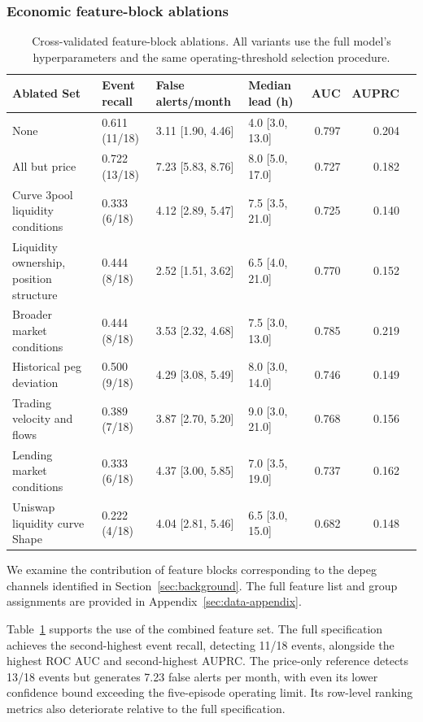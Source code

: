 \documentclass[a4paper,fleqn]{cas-sc}
\begin{document}
\subsubsection{Economic feature-block ablations}
\label{sec:ablation_results}

\begin{table}[pos=!htbp,align=\centering]
\caption{Cross-validated feature-block ablations. All variants use the full model's hyperparameters and the same operating-threshold selection procedure.}
\label{tab:ablation_15_kumo_tabular}
\begin{tabular}{llllrrr}
\toprule
Ablated Set & Event recall & False alerts/month & Median lead (h) & AUC & AUPRC \\
\midrule
None & 0.611 (11/18) & 3.11 [1.90, 4.46] & 4.0 [3.0, 13.0] & 0.797 & 0.204 \\
All but price & 0.722 (13/18) & 7.23 [5.83, 8.76] & 8.0 [5.0, 17.0] & 0.727 & 0.182 \\
Curve 3pool liquidity conditions & 0.333 (6/18) & 4.12 [2.89, 5.47] & 7.5 [3.5, 21.0] & 0.725 & 0.140  \\
Liquidity ownership, position structure & 0.444 (8/18) & 2.52 [1.51, 3.62] & 6.5 [4.0, 21.0] & 0.770 & 0.152  \\
Broader market conditions & 0.444 (8/18) & 3.53 [2.32, 4.68] & 7.5 [3.0, 13.0] & 0.785 & 0.219\\
Historical peg deviation & 0.500 (9/18) & 4.29 [3.08, 5.49] & 8.0 [3.0, 14.0] & 0.746 & 0.149 \\
Trading velocity and flows & 0.389 (7/18) & 3.87 [2.70, 5.20] & 9.0 [3.0, 21.0] & 0.768 & 0.156 \\
Lending market conditions & 0.333 (6/18) & 4.37 [3.00, 5.85] & 7.0 [3.5, 19.0] & 0.737 & 0.162 \\
Uniswap liquidity curve Shape & 0.222 (4/18) & 4.04 [2.81, 5.46] & 6.5 [3.0, 15.0] & 0.682 & 0.148 \\
\bottomrule
\end{tabular}
\end{table}

We examine the contribution of feature blocks corresponding to the depeg channels identified in Section~\ref{sec:background}. The full feature list and group assignments are provided in Appendix~\ref{sec:data-appendix}.

Table~\ref{tab:ablation_15_kumo_tabular} supports the use of the combined feature set. The full specification achieves the second-highest event recall, detecting 11/18 events, alongside the highest ROC AUC and second-highest AUPRC. The price-only reference detects 13/18 events but generates 7.23 false alerts per month, with even its lower confidence bound exceeding the five-episode operating limit. Its row-level ranking metrics also deteriorate relative to the full specification.
\end{document}
